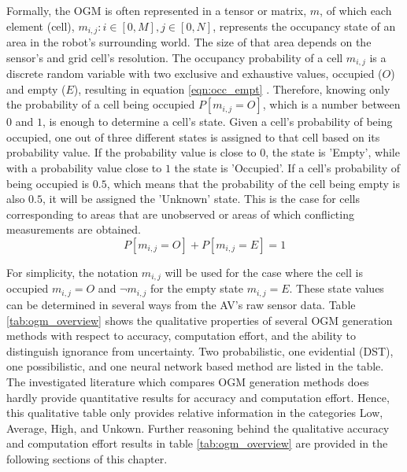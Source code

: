 Formally, the \gls{OGM} is often represented in a tensor or matrix, $m$, of which each element (cell), $m_{i,j}: i \in [0, M],j \in [0, N]$, represents the occupancy state of an area in the robot's surrounding world. The size of that area depends on the sensor's and grid cell's resolution. The occupancy probability of a cell $m_{i,j}$ is a discrete random variable with two exclusive and exhaustive values, occupied ($O$) and empty ($E$), resulting in equation \ref{eqn:occ_empt} \cite{elfes1989using}. Therefore, knowing only the probability of a cell being occupied $P[m_{i,j} = O]$, which is a number between $0$ and $1$, is enough to determine a cell's state. Given a cell's probability of being occupied, one out of three different states is assigned to that cell based on its probability value. If the probability value is close to $0$, the state is 'Empty', while with a probability value close to $1$ the state is 'Occupied'. If a cell's probability of being occupied is $0.5$, which means that the probability of the cell being empty is also $0.5$, it will be assigned the 'Unknown' state. This is the case for cells corresponding to areas that are unobserved or areas of which conflicting measurements are obtained. \\

\begin{equation} \label{eqn:occ_empt}
	P[m_{i,j} = O] + P[m_{i,j} = E] = 1
\end{equation} 

\hfill \break

For simplicity, the notation $m_{i,j}$ will be used for the case where the cell is occupied $m_{i,j} = O$ and $\neg m_{i,j}$ for the empty state $m_{i,j} = E$.
These state values can be determined in several ways from the \gls{AV}'s raw sensor data. Table \ref{tab:ogm_overview} shows the qualitative properties of several \gls{OGM} generation methods with respect to accuracy, computation effort, and the ability to distinguish ignorance from uncertainty. Two probabilistic, one evidential (\gls{DST}), one possibilistic, and one neural network based method are listed in the table.  The investigated literature which compares \gls{OGM} generation methods does hardly provide quantitative results for accuracy and computation effort. Hence, this qualitative table only provides relative information in the categories Low, Average, High, and Unkown. Further reasoning behind the qualitative accuracy and computation effort results in table \ref{tab:ogm_overview} are provided in the following sections of this chapter. \\

